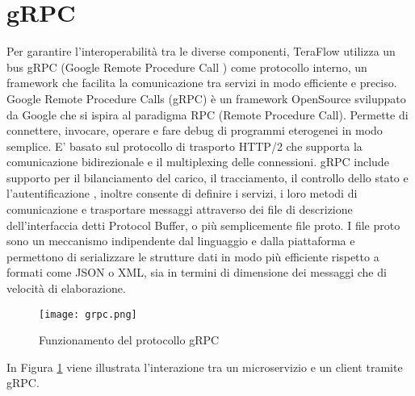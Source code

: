 \section{gRPC} \label{grpc}
Per garantire l'interoperabilità tra le diverse componenti, TeraFlow utilizza un bus gRPC (Google Remote Procedure Call \cite{grpc}) come protocollo interno, 
un framework che facilita la comunicazione tra servizi in modo efficiente e preciso. 
\newline Google Remote Procedure Calls (gRPC\cite{grpc}) è un framework OpenSource sviluppato da Google che si ispira al paradigma RPC (Remote Procedure Call). Permette di
connettere, invocare, operare e fare debug di programmi eterogenei in modo semplice.
\newline E' basato sul protocollo di trasporto HTTP/2 che supporta la comunicazione bidirezionale e il multiplexing delle connessioni.
\newline gRPC include supporto per il bilanciamento del carico, il tracciamento, il controllo dello stato e l'autentificazione\cite{grpcArt3} \cite{grpcArt1}, inoltre
consente di definire i servizi, i loro metodi di comunicazione e trasportare messaggi attraverso dei file di descrizione dell'interfaccia detti Protocol Buffer, o più semplicemente file proto.
\newline I file proto sono un meccanismo indipendente dal linguaggio e dalla piattaforma 
e permettono di serializzare le strutture dati in modo più efficiente rispetto a formati come JSON o XML, sia in termini di dimensione dei messaggi che di velocità di elaborazione.
\begin{figure}[h]
    \centering
   \texttt{[image: grpc.png]}
    \caption{Funzionamento del protocollo gRPC \cite{librogrpc}}
    \label{fig:grpc}
\end{figure}
In Figura \ref{fig:grpc} viene illustrata l'interazione tra un microservizio e un client tramite gRPC.
